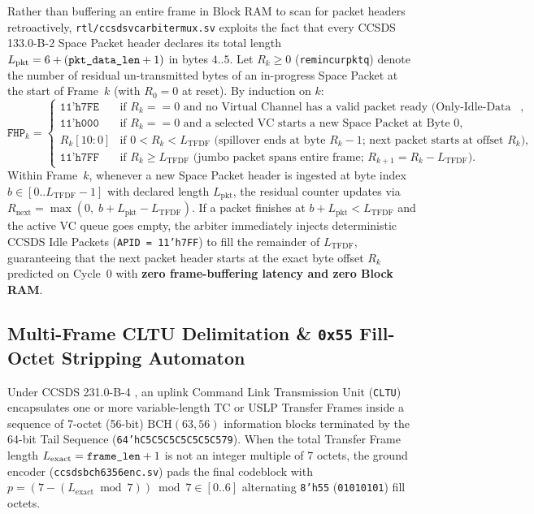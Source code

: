 \documentclass[10pt,a4paper]{article}
\renewcommand{\_}{\origunderscore\penalty0\hskip0pt\relax}
\numberwithin{equation}{section}
\numberwithin{table}{section}
\numberwithin{figure}{section}
\begin{document}
Rather than buffering an entire frame in Block RAM to scan for packet headers retroactively, \texttt{rtl/ccsds\_vc\_arbiter\_mux.sv} exploits the fact that every CCSDS 133.0-B-2 Space Packet header declares its total length $L_{\text{pkt}} = 6 + (\texttt{pkt\_data\_len} + 1)$ in bytes $4..5$. Let $R_k \ge 0$ (\texttt{rem\_in\_cur\_pkt\_q}) denote the number of residual un-transmitted bytes of an in-progress Space Packet at the start of Frame~$k$ (with $R_0 = 0$ at reset). By induction on $k$:
\begin{equation}
  \texttt{FHP}_k = \begin{cases}
    \texttt{11'h7FE} & \text{if } R_k == 0 \text{ and no Virtual Channel has a valid packet ready (Only-Idle-Data frame)}, \\
    \texttt{11'h000} & \text{if } R_k == 0 \text{ and a selected VC starts a new Space Packet at Byte 0}, \\
    R_k[10:0]        & \text{if } 0 < R_k < L_{\text{TFDF}} \text{ (spillover ends at byte } R_k-1\text{; next packet starts at offset } R_k\text{)}, \\
    \texttt{11'h7FF} & \text{if } R_k \ge L_{\text{TFDF}} \text{ (jumbo packet spans entire frame; } R_{k+1} = R_k - L_{\text{TFDF}}\text{)}.
  \end{cases}
\end{equation}
Within Frame~$k$, whenever a new Space Packet header is ingested at byte index $b \in [0..L_{\text{TFDF}}-1]$ with declared length $L_{\text{pkt}}$, the residual counter updates via $R_{\text{next}} = \max(0,\; b + L_{\text{pkt}} - L_{\text{TFDF}})$. If a packet finishes at $b + L_{\text{pkt}} < L_{\text{TFDF}}$ and the active VC queue goes empty, the arbiter immediately injects deterministic CCSDS Idle Packets (\texttt{APID = 11'h7FF}) to fill the remainder of $L_{\text{TFDF}}$, guaranteeing that the next packet header starts at the exact byte offset $R_k$ predicted on Cycle~0 with \textbf{zero frame-buffering latency and zero Block RAM}.

\subsection{Multi-Frame CLTU Delimitation \& \texttt{0x55} Fill-Octet Stripping Automaton}
Under CCSDS 231.0-B-4 \cite{ccsds231}, an uplink Command Link Transmission Unit (\texttt{CLTU}) encapsulates one or more variable-length TC or USLP Transfer Frames inside a sequence of 7-octet (56-bit) $\text{BCH}(63,56)$ information blocks terminated by the 64-bit Tail Sequence (\texttt{64'hC5C5\_C5C5\_C5C5\_C579}). When the total Transfer Frame length $L_{\text{exact}} = \texttt{frame\_len} + 1$ is not an integer multiple of 7 octets, the ground encoder (\texttt{ccsds\_bch6356\_enc.sv}) pads the final codeblock with $p = (7 - (L_{\text{exact}} \bmod 7)) \bmod 7 \in [0..6]$ alternating \texttt{8'h55} (\texttt{01010101\_2}) fill octets.
\end{document}
